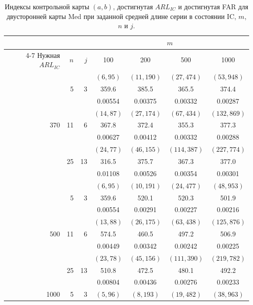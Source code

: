 \begin{table}[!ht]
	\centering
	\caption{Индексы контрольной карты \((a, b)\), достигнутая \(ARL_{IC}\) и достигнутая FAR для двусторонней карты Med при заданной средней длине серии в состоянии IC, \(m\), \(n\) и \(j\).}
	\label{tab:4.18}
	\small
	\begin{tabular}{@{}rrrcccc@{}}
		\toprule
		& & & \multicolumn{4}{c}{\(m\)} \\
		\cmidrule(lr){4-7}
		Нужная \(ARL_{IC}\) & \(n\) & \(j\) & 100 & 200 & 500 & 1000 \\
		\midrule
		\multirow{9}{*}{370} & \multirow{3}{*}{5} & \multirow{3}{*}{3} & \((6,95)\) & \((11,190)\) & \((27,474)\) & \((53,948)\) \\
		& & & 359.6 & 385.5 & 365.5 & 374.4 \\
		& & & 0.00554 & 0.00375 & 0.00332 & 0.00287 \\
		& \multirow{3}{*}{11} & \multirow{3}{*}{6} & \((14,87)\) & \((27,174)\) & \((67,434)\) & \((132,869)\) \\
		& & & 367.8 & 372.4 & 355.3 & 377.3 \\
		& & & 0.00627 & 0.00412 & 0.00332 & 0.00288 \\
		& \multirow{3}{*}{25} & \multirow{3}{*}{13} & \((24,77)\) & \((46,155)\) & \((114,387)\) & \((227,774)\) \\
		& & & 316.5 & 375.7 & 367.3 & 377.0 \\
		& & & 0.01108 & 0.00526 & 0.00354 & 0.00301 \\
		\midrule
		\multirow{9}{*}{500} & \multirow{3}{*}{5} & \multirow{3}{*}{3} & \((6,95)\) & \((10,191)\) & \((24,477)\) & \((48,953)\) \\
		& & & 359.6 & 520.1 & 520.3 & 501.9 \\
		& & & 0.00554 & 0.00291 & 0.00227 & 0.00216 \\
		& \multirow{3}{*}{11} & \multirow{3}{*}{6} & \((13,88)\) & \((26,175)\) & \((63,438)\) & \((125,876)\) \\
		& & & 574.5 & 460.5 & 497.2 & 506.9 \\
		& & & 0.00449 & 0.00342 & 0.00242 & 0.00225 \\
		& \multirow{3}{*}{25} & \multirow{3}{*}{13} & \((23,78)\) & \((45,156)\) & \((111,390)\) & \((219,782)\) \\
		& & & 510.8 & 472.5 & 480.1 & 492.2 \\
		& & & 0.00804 & 0.00436 & 0.00276 & 0.00233 \\
		\midrule
		\multirow{9}{*}{1000} & \multirow{3}{*}{5} & \multirow{3}{*}{3} & \((5,96)\) & \((8,193)\) & \((19,482)\) & \((38,963)\) \\

\end{tabular}
\end{table}
